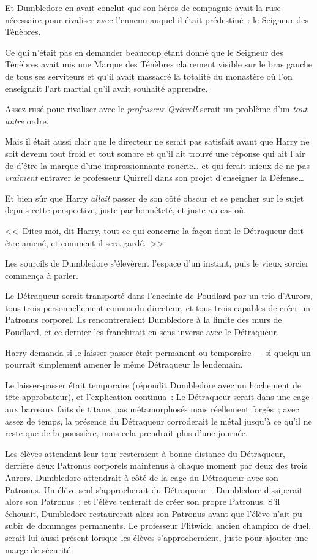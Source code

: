 Et Dumbledore en avait conclut que son héros de compagnie avait la ruse nécessaire pour rivaliser avec l'ennemi auquel il était prédestiné~: le Seigneur des Ténèbres.

Ce qui n'était pas en demander beaucoup étant donné que le Seigneur des Ténèbres avait mis une Marque des Ténèbres clairement visible sur le bras gauche de tous ses serviteurs et qu'il avait massacré la totalité du monastère où l'on enseignait l'art martial qu'il avait souhaité apprendre.

Assez rusé pour rivaliser avec le \emph{professeur Quirrell} serait un problème d'un \emph{tout} \emph{autre} ordre.

Mais il était aussi clair que le directeur ne serait pas satisfait avant que Harry ne soit devenu tout froid et tout sombre et qu'il ait trouvé une réponse qui ait l'air de d'être la marque d'une impressionnante rouerie… et qui ferait mieux de ne pas \emph{vraiment} entraver le professeur Quirrell dans son projet d'enseigner la Défense…

Et bien sûr que Harry \emph{allait} passer de son côté obscur et se pencher sur le sujet depuis cette perspective, juste par honnêteté, et juste au cas où.

<<~Dites-moi, dit Harry, tout ce qui concerne la façon dont le Détraqueur doit être amené, et comment il sera gardé.~>>

Les sourcils de Dumbledore s'élevèrent l'espace d'un instant, puis le vieux sorcier commença à parler.

Le Détraqueur serait transporté dans l'enceinte de Poudlard par un trio d'Aurors, tous trois personnellement connus du directeur, et tous trois capables de créer un Patronus corporel. Ils rencontreraient Dumbledore à la limite des murs de Poudlard, et ce dernier les franchirait en sens inverse avec le Détraqueur.

Harry demanda si le laisser-passer était permanent ou temporaire — si quelqu'un pourrait simplement amener le même Détraqueur le lendemain.

Le laisser-passer était temporaire (répondit Dumbledore avec un hochement de tête approbateur), et l'explication continua~: Le Détraqueur serait dans une cage aux barreaux faits de titane, pas métamorphosés mais réellement forgés~; avec assez de temps, la présence du Détraqueur corroderait le métal jusqu'à ce qu'il ne reste que de la poussière, mais cela prendrait plus d'une journée.

Les élèves attendant leur tour resteraient à bonne distance du Détraqueur, derrière deux Patronus corporels maintenus à chaque moment par deux des trois Aurors. Dumbledore attendrait à côté de la cage du Détraqueur avec son Patronus. Un élève seul s'approcherait du Détraqueur~; Dumbledore dissiperait alors son Patronus~; et l'élève tenterait de créer son propre Patronus. S'il échouait, Dumbledore restaurerait alors son Patronus avant que l'élève n'ait pu subir de dommages permanents. Le professeur Flitwick, ancien champion de duel, serait lui aussi présent lorsque les élèves s'approcheraient, juste pour ajouter une marge de sécurité.

